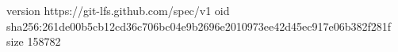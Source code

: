 version https://git-lfs.github.com/spec/v1
oid sha256:261de00b5cb12cd36c706bc04e9b2696e2010973ee42d45ec917e06b382f281f
size 158782
